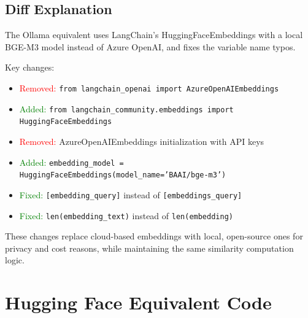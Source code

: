 \documentclass[11pt, a4paper]{article}
\begin{document}
\subsection{Diff Explanation}

The Ollama equivalent uses LangChain's HuggingFaceEmbeddings with a local BGE-M3 model instead of Azure OpenAI, and fixes the variable name typos.

Key changes:
\begin{itemize}
    \item \textcolor{red}{Removed:} \texttt{from langchain\_openai import AzureOpenAIEmbeddings}
    \item \textcolor{green}{Added:} \texttt{from langchain\_community.embeddings import HuggingFaceEmbeddings}
    \item \textcolor{red}{Removed:} AzureOpenAIEmbeddings initialization with API keys
    \item \textcolor{green}{Added:} \texttt{embedding\_model = HuggingFaceEmbeddings(model\_name='BAAI/bge-m3')}
    \item \textcolor{green}{Fixed:} \texttt{[embedding\_query]} instead of \texttt{[embeddings\_query]}
    \item \textcolor{green}{Fixed:} \texttt{len(embedding\_text)} instead of \texttt{len(embedding)}
\end{itemize}

These changes replace cloud-based embeddings with local, open-source ones for privacy and cost reasons, while maintaining the same similarity computation logic.

\section{Hugging Face Equivalent Code}
\end{document}
